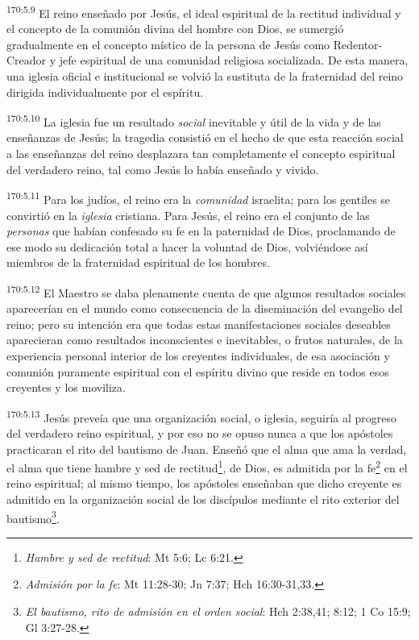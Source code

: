 \par
\textsuperscript{170:5.9} El reino enseñado por Jesús, el ideal espiritual de la rectitud individual y el concepto de la comunión divina del hombre con Dios, se sumergió gradualmente en el concepto místico de la persona de Jesús como Redentor-Creador y jefe espiritual de una comunidad religiosa socializada. De esta manera, una iglesia oficial e institucional se volvió la sustituta de la fraternidad del reino dirigida individualmente por el espíritu.

\par
\textsuperscript{170:5.10} La iglesia fue un resultado \textit{social} inevitable y útil de la vida y de las enseñanzas de Jesús; la tragedia consistió en el hecho de que esta reacción social a las enseñanzas del reino desplazara tan completamente el concepto espiritual del verdadero reino, tal como Jesús lo había enseñado y vivido.

\par
\textsuperscript{170:5.11} Para los judíos, el reino era la \textit{comunidad} israelita; para los gentiles se convirtió en la \textit{iglesia} cristiana. Para Jesús, el reino era el conjunto de las \textit{personas} que habían confesado su fe en la paternidad de Dios, proclamando de ese modo su dedicación total a hacer la voluntad de Dios, volviéndose así miembros de la fraternidad espiritual de los hombres.

\par
\textsuperscript{170:5.12} El Maestro se daba plenamente cuenta de que algunos resultados sociales aparecerían en el mundo como consecuencia de la diseminación del evangelio del reino; pero su intención era que todas estas manifestaciones sociales deseables aparecieran como resultados inconscientes e inevitables, o frutos naturales, de la experiencia personal interior de los creyentes individuales, de esa asociación y comunión puramente espiritual con el espíritu divino que reside en todos esos creyentes y los moviliza.

\par
\textsuperscript{170:5.13} Jesús preveía que una organización social, o iglesia, seguiría al progreso del verdadero reino espiritual, y por eso no se opuso nunca a que los apóstoles practicaran el rito del bautismo de Juan. Enseñó que el alma que ama la verdad, el alma que tiene hambre y sed de rectitud\footnote{\textit{Hambre y sed de rectitud}: Mt 5:6; Lc 6:21.}, de Dios, es admitida por la fe\footnote{\textit{Admisión por la fe}: Mt 11:28-30; Jn 7:37; Hch 16:30-31,33.} en el reino espiritual; al mismo tiempo, los apóstoles enseñaban que dicho creyente es admitido en la organización social de los discípulos mediante el rito exterior del bautismo\footnote{\textit{El bautismo, rito de admisión en el orden social}: Hch 2:38,41; 8:12; 1 Co 15:9; Gl 3:27-28.}.

